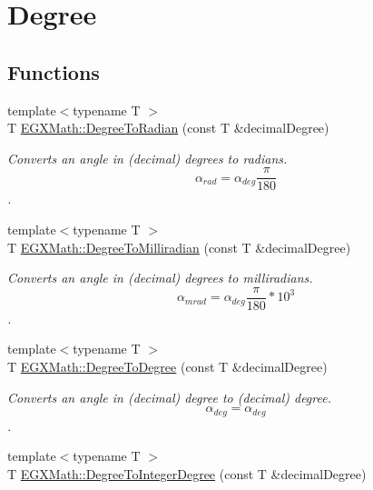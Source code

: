 \hypertarget{group___e_g_x_math-_angle_conversions-_degree}{}\section{Degree}
\label{group___e_g_x_math-_angle_conversions-_degree}
\subsection*{Functions}
\begin{DoxyCompactItemize}
\item 
{\footnotesize template$<$typename T $>$ }\\T \mbox{\hyperlink{group___e_g_x_math-_angle_conversions-_degree_ga48585541b228c852c9d08a9eac3682f0}{E\+G\+X\+Math\+::\+Degree\+To\+Radian}} (const T \&decimal\+Degree)
\begin{DoxyCompactList}\small\item\em Converts an angle in (decimal) degrees to radians. \[\alpha_{rad}=\alpha_{deg}\frac{\pi}{180}\]. \end{DoxyCompactList}\item 
{\footnotesize template$<$typename T $>$ }\\T \mbox{\hyperlink{group___e_g_x_math-_angle_conversions-_degree_gae4fa6c2d3805430760783650cfbfdb11}{E\+G\+X\+Math\+::\+Degree\+To\+Milliradian}} (const T \&decimal\+Degree)
\begin{DoxyCompactList}\small\item\em Converts an angle in (decimal) degrees to milliradians. \[\alpha_{mrad}=\alpha_{deg}\frac{\pi}{180}*10^3\]. \end{DoxyCompactList}\item 
{\footnotesize template$<$typename T $>$ }\\T \mbox{\hyperlink{group___e_g_x_math-_angle_conversions-_degree_gaca157e7d3e99a46a11a04b92680d2574}{E\+G\+X\+Math\+::\+Degree\+To\+Degree}} (const T \&decimal\+Degree)
\begin{DoxyCompactList}\small\item\em Converts an angle in (decimal) degree to (decimal) degree. \[\alpha_{deg}=\alpha_{deg}\]. \end{DoxyCompactList}\item 
{\footnotesize template$<$typename T $>$ }\\T \mbox{\hyperlink{group___e_g_x_math-_angle_conversions-_degree_gaabd20f21be3c18ee423d0bc1a677c6f6}{E\+G\+X\+Math\+::\+Degree\+To\+Integer\+Degree}} (const T \&decimal\+Degree)

\end{DoxyCompactItemize}
